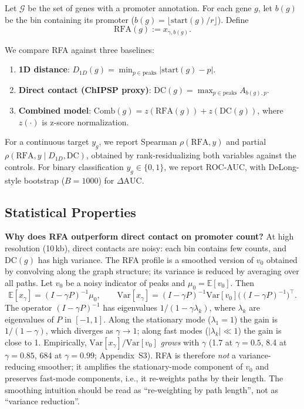 \documentclass[11pt,a4paper]{article}
\begin{document}
Let $\mathcal{G}$ be the set of genes with a promoter annotation. For each gene $g$, let $b(g)$ be the bin containing its promoter ($b(g) = \lfloor \mathrm{start}(g)/r \rfloor$). Define
\begin{equation}
\mathrm{RFA}(g) := x_{\gamma, b(g)}.
\end{equation}

We compare RFA against three baselines:
\begin{enumerate}
    \item \textbf{1D distance}: $D_{1D}(g) = \min_{p \in \mathrm{peaks}} |\mathrm{start}(g) - p|$.
    \item \textbf{Direct contact (ChIPSP proxy)}: $\mathrm{DC}(g) = \max_{p \in \mathrm{peaks}} A_{b(g), p}$.
    \item \textbf{Combined model}: $\mathrm{Comb}(g) = z(\mathrm{RFA}(g)) + z(\mathrm{DC}(g))$, where $z(\cdot)$ is z-score normalization.
\end{enumerate}

For a continuous target $y_g$, we report Spearman $\rho(\mathrm{RFA}, y)$ and partial $\rho(\mathrm{RFA}, y \mid D_{1D}, \mathrm{DC})$, obtained by rank-residualizing both variables against the controls. For binary classification $y_g \in \{0,1\}$, we report ROC-AUC, with DeLong-style bootstrap ($B=1000$) for $\Delta \mathrm{AUC}$.

\subsection{Statistical Properties}

\textbf{Why does RFA outperform direct contact on promoter count?} At high resolution (10\,kb), direct contacts are noisy: each bin contains few counts, and $\mathrm{DC}(g)$ has high variance. The RFA profile is a smoothed version of $v_0$ obtained by convolving along the graph structure; its variance is reduced by averaging over all paths. Let $v_0$ be a noisy indicator of peaks and $\mu_0 = \mathbb{E}[v_0]$. Then
\begin{equation}
\mathbb{E}[x_\gamma] = (I-\gamma P)^{-1} \mu_0, \qquad \mathrm{Var}[x_\gamma] = (I-\gamma P)^{-1} \mathrm{Var}[v_0] \big((I-\gamma P)^{-1}\big)^\top.
\end{equation}
The operator $(I-\gamma P)^{-1}$ has eigenvalues $1/(1-\gamma\lambda_k)$, where $\lambda_k$ are eigenvalues of $P$ in $[-1,1]$. Along the stationary mode ($\lambda_1=1$) the gain is $1/(1-\gamma)$, which diverges as $\gamma\to 1$; along fast modes ($|\lambda_k|\ll 1$) the gain is close to 1. Empirically, $\mathrm{Var}[x_\gamma]/\mathrm{Var}[v_0]$ \emph{grows} with $\gamma$ (1.7 at $\gamma=0.5$, 8.4 at $\gamma=0.85$, 684 at $\gamma=0.99$; Appendix~S3). RFA is therefore \emph{not} a variance-reducing smoother; it amplifies the stationary-mode component of $v_0$ and preserves fast-mode components, i.e., it re-weights paths by their length. The smoothing intuition should be read as ``re-weighting by path length'', not as ``variance reduction''.
\end{document}
